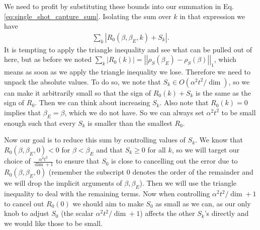 \documentclass{article}
\newcommand{\abs}[1]{\left| #1 \right|}
\newcommand{\norm}[1]{\left| \left| #1 \right| \right|}
\newcommand{\bigo}[1]{O\left( #1 \right)}
\begin{document}
We need to profit by substituting these bounds into our summation in Eq. \eqref{eq:single_shot_capture_sum}. Isolating the sum over $k$ in that expression we have
\begin{align}
    \sum_{k} \abs{R_0(\beta, \beta_E, k) + S_k}.
\end{align}
It is tempting to apply the triangle inequality and see what can be pulled out of here, but as before we noted $\sum_k \abs{R_0(k)} = \norm{\rho_S(\beta_E) - \rho_S(\beta)}_1$, which means as soon as we apply the triangle inequality we lose. Therefore we need to unpack the absolute values. To do so, we note that $S_k \in \bigo{\alpha^2 t^2 / \dim}$, so we can make it arbitrarily small so that the sign of $R_0(k) + S_k$ is the same as the sign of $R_0$. Then we can think about increasing $S_k$. Also note that $R_0(k) = 0$ implies that $\beta_E = \beta$, which we do not have. So we can always set $\alpha^2 t^2$ to be small enough such that every $S_k$ is smaller than the smallest $R_0$. 

Now our goal is to reduce this sum by controlling values of $S_k$. We know that $R_0(\beta, \beta_E, 0) < 0$ for $\beta < \beta_E$ and that $S_k \geq 0$ for all $k$, so we will target our choice of $\frac{\alpha^2 t^2}{\dim + 1}$ to ensure that $S_0$ is close to cancelling out the error due to $R_0(\beta, \beta_E, 0)$ (remember the subscript 0 denotes the order of the remainder and we will drop the implicit arguments of $\beta, \beta_E$). Then we will use the triangle inequality to deal with the remaining terms. Now when controlling $\alpha^2 t^2 / \dim + 1$ to cancel out $R_0(0)$ we should aim to make $S_0$ as small as we can, as our only knob to adjust $S_0$ (the scalar $\alpha^2 t^2 / \dim + 1$) affects the other $S_k$'s directly and we would like those to be small. 
\end{document}
